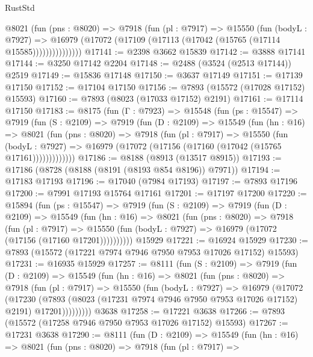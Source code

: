 \begin{lexlean}{RustStd}
\begin{coremodule}
              @8021
                (fun (pns : @8020) =>
                @7918
                  (fun (pl : @7917) =>
                  @15550
                    (fun (bodyL : @7927) =>
                    @16979 (@17072 (@17109 (@17113 (@17042 (@15765 (@17114 @15585)))))))))))))))
@17141 := @2398 @3662 @15839
@17142 := @3888 @17141
@17144 := @3250 @17142 @2204
@17148 := @2488 (@3524 (@2513 @17144)) @2519
@17149 := @15836 @17148
@17150 := @3637 @17149
@17151 := @17139 @17150
@17152 := @17104 @17150
@17156 := @7893 (@15572 (@17028 @17152) @15593)
@17160 := @7893 (@8023 (@17033 @17152) @2191)
@17161 := @17114 @17150
@17183 := @8175
    (fun (Γ : @7923) =>
    @15548
      (fun (ps : @15547) =>
      @7919
        (fun (S : @2109) =>
        @7919
          (fun (D : @2109) =>
          @15549
            (fun (hn : @16) =>
            @8021
              (fun (pns : @8020) =>
              @7918
                (fun (pl : @7917) =>
                @15550
                  (fun (bodyL : @7927) =>
                  @16979 (@17072 (@17156 (@17160 (@17042 (@15765 @17161)))))))))))))
@17186 := @8188 (@8913 (@13517 @8915))
@17193 := @17186 (@8728 (@8188 (@8191 (@8193 @854 @8196)) @7971))
@17194 := @17183 @17193
@17196 := @17040 (@7984 @17193)
@17197 := @7893 @17196
@17200 := @7991 @17193 @15764 @17161
@17201 := @17197 @17200
@17220 := @15894
    (fun (ps : @15547) =>
    @7919
      (fun (S : @2109) =>
      @7919
        (fun (D : @2109) =>
        @15549
          (fun (hn : @16) =>
          @8021
            (fun (pns : @8020) =>
            @7918
              (fun (pl : @7917) =>
              @15550 (fun (bodyL : @7927) => @16979 (@17072 (@17156 (@17160 @17201))))))))))
    @15929
@17221 := @16924 @15929
@17230 := @7893 (@15572 (@17221 @7974 @7946 @7950 @7953 @17026 @17152) @15593)
@17231 := @16935 @15929
@17257 := @8111
    (fun (S : @2109) =>
    @7919
      (fun (D : @2109) =>
      @15549
        (fun (hn : @16) =>
        @8021
          (fun (pns : @8020) =>
          @7918
            (fun (pl : @7917) =>
            @15550
              (fun (bodyL : @7927) =>
              @16979
                (@17072
                  (@17230
                    (@7893
                      (@8023 (@17231 @7974 @7946 @7950 @7953 @17026 @17152) @2191)
                      @17201)))))))))
    @3638
@17258 := @17221 @3638
@17266 := @7893 (@15572 (@17258 @7946 @7950 @7953 @17026 @17152) @15593)
@17267 := @17231 @3638
@17290 := @8111
    (fun (D : @2109) =>
    @15549
      (fun (hn : @16) =>
      @8021
        (fun (pns : @8020) =>
        @7918
          (fun (pl : @7917) =>

\end{coremodule}
\end{lexlean}
